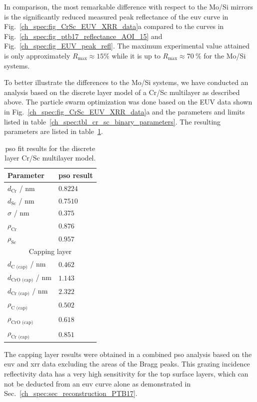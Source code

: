 In comparison, the most remarkable difference with respect to the Mo/Si mirrors is the significantly reduced measured peak reflectance of the \gls{euv} curve in Fig.~\ref{ch_spec:fig_CrSc_EUV_XRR_data}a compared to the curves in Fig.~\ref{ch_spec:fig_ptb17_reflectance_AOI_15} and Fig.~\ref{ch_spec:fig_EUV_peak_refl}. The maximum experimental value attained is only approximately $R_\text{max} \approx 15\%$ while it is up to $R_\text{max} \approx \SI{70}{\percent}$ for the Mo/Si systems.

To better illustrate the differences to the Mo/Si systems, we have conducted an 
analysis based on the discrete layer model of a Cr/Sc multilayer as described above. The particle swarm optimization was done based on the EUV data shown in Fig.~\ref{ch_spec:fig_CrSc_EUV_XRR_data}a and the parameters and limits listed in table~\ref{ch_spec:tbl_cr_sc_binary_parameters}. The resulting parameters are listed in table~\ref{ch_spec:tbl_cr_sc_binary_pso_results}.
\begin{table}[htbp]
\centering
\caption{\gls{pso} fit results for the discrete layer Cr/Sc multilayer model.}
\label{ch_spec:tbl_cr_sc_binary_pso_results}
\begin{tabular}{@{}ll@{}}
\toprule
Parameter &  \gls{pso} result\\ \midrule
$d_\text{Cr}$ / nm &  $0.8224$\\ 
$d_\text{Sc}$ / nm &  $0.7510$\\ 
$\sigma$ / nm &  $0.375$\\ 
$\rho_\text{Cr}$  & $0.876$\\ 
$\rho_\text{Sc}$ & $0.957$\\ 
\midrule
\multicolumn{2}{c}{Capping layer}\\
\midrule
$d_\text{C (cap)}$ / nm  & $0.462$ \\ 
$d_\text{CrO (cap)}$ / nm  & $1.143$ \\ 
$d_\text{Cr (cap)}$ / nm  & $2.322$ \\ 
$\rho_\text{C (cap)}$ & $0.502$\\ 
$\rho_\text{CrO (cap)}$& $0.618$\\
$\rho_\text{Cr (cap)}$ & $0.851$\\
 \bottomrule
\end{tabular}
\end{table}
The capping layer results were obtained in a combined \gls{pso} analysis based on the \gls{euv} and \gls{xrr} data excluding the areas of the Bragg peaks. This grazing incidence reflectivity data has a very high sensitivity for the top surface layers, which can not be deducted from an \gls{euv} curve alone as demonstrated in Sec.~\ref{ch_spec:sec_reconstruction_PTB17}.

